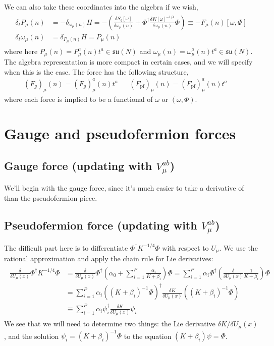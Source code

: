 We can also take these coordinates into the algebra if we wish,
\begin{align}\begin{split}
	\delta_t P_\mu(n) &= -\delta_{\omega_\mu(n)} H = - \left( \frac{\delta S_g[\omega]}{\delta\omega_\mu(n)} + \Phi^\dagger \frac{\delta K[\omega]^{-1/4}}{\delta \omega_\mu(n)} \Phi \right) \equiv - F_\mu(n)[\omega, \Phi] \\
	\delta_t \omega_\mu(n) &= \delta_{P_\mu(n)} H = P_\mu(n)
\end{split}\end{align}
where here $P_\mu(n) = P_\mu^a(n) t^a\in\mathfrak{su}(N)$ and $\omega_\mu(n) = \omega_\mu^a(n) t^a\in\mathfrak{su}(N)$. The algebra representation is more compact in certain cases, and we will specify when this is the case. The force has the following structure,
\begin{align}
	(F_g)_\mu(n) = (F_g)_\mu^a(n) t^a && (F_\mathrm{pf})_\mu(n) = (F_\mathrm{pf})_\mu^a(n) t^a && 
\end{align}
where each force is implied to be a functional of $\omega$ or $(\omega, \Phi)$. 

\section{Gauge and pseudofermion forces}

\subsection{Gauge force (updating with $V_\mu^{ab}$)}

We'll begin with the gauge force, since it's much easier to take a derivative of than the pseudofermion piece.

\subsection{Pseudofermion force (updating with $V_\mu^{ab}$)}

The difficult part here is to differentiate $\Phi^\dagger K^{-1/4} \Phi$ with respect to $U_\mu$. We use the rational approximation and apply the chain rule for Lie derivatives:
\begin{align}\begin{split}
	\frac{\delta}{\delta U_\mu(x)} \Phi^\dagger K^{-1/4} \Phi &= \frac{\delta}{\delta U_\mu(x)} \Phi^\dagger \left( \alpha_0 + \sum_{i = 1}^P \frac{\alpha_i}{K + \beta_i} \right) \Phi = \sum_{i = 1}^P \alpha_i \Phi^\dagger \left(  \frac{\delta}{\delta U_\mu(x)} \frac{1}{K + \beta_i} \right) \Phi \\
	&= \sum_{i = 1}^P \alpha_i \left( (K + \beta_i)^{-1} \Phi \right)^\dagger \frac{\delta K}{\delta U_\mu(x)} \left( (K + \beta_i)^{-1} \Phi \right) \\
	&\equiv \sum_{i = 1}^P \alpha_i \psi_i^\dagger \frac{\delta K}{\delta U_\mu(x)} \psi_i
\end{split}\end{align}
We see that we will need to determine two things: the Lie derivative $\delta K / \delta U_\mu(x)$, and the solution $\psi_i = (K + \beta_i)^{-1} \Phi$ to the equation $(K + \beta_i) \psi = \Phi$.

